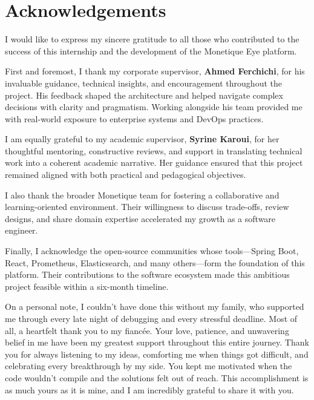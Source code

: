\documentclass[12pt,a4paper]{report}
\begin{document}



\chapter*{Acknowledgements}

I would like to express my sincere gratitude to all those who contributed to the success of this internship and the development of the Monetique Eye platform.

First and foremost, I thank my corporate supervisor, \textbf{Ahmed Ferchichi}, for his invaluable guidance, technical insights, and encouragement throughout the project. His feedback shaped the architecture and helped navigate complex decisions with clarity and pragmatism. Working alongside his team provided me with real-world exposure to enterprise systems and DevOps practices.

I am equally grateful to my academic supervisor, \textbf{Syrine Karoui}, for her thoughtful mentoring, constructive reviews, and support in translating technical work into a coherent academic narrative. Her guidance ensured that this project remained aligned with both practical and pedagogical objectives.

I also thank the broader Monetique team for fostering a collaborative and learning-oriented environment. Their willingness to discuss trade-offs, review designs, and share domain expertise accelerated my growth as a software engineer.

Finally, I acknowledge the open-source communities whose tools—Spring Boot, React, Prometheus, Elasticsearch, and many others—form the foundation of this platform. Their contributions to the software ecosystem made this ambitious project feasible within a six-month timeline.

On a personal note, I couldn't have done this without my family, who supported me through every late night of debugging and every stressful deadline. Most of all, a heartfelt thank you to my fiancée. Your love, patience, and unwavering belief in me have been my greatest support throughout this entire journey. Thank you for always listening to my ideas, comforting me when things got difficult, and celebrating every breakthrough by my side. You kept me motivated when the code wouldn't compile and the solutions felt out of reach. This accomplishment is as much yours as it is mine, and I am incredibly grateful to share it with you.
\end{document}
